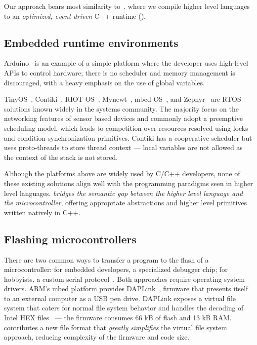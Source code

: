 Our approach bears most similarity to~\cite{varma2004java}, where we compile higher level languages to an \emph{optimized, event-driven} C++ runtime (\CON).

\subsection{Embedded runtime environments}


Arduino~\cite{buildingArduino2014} is an example of a simple platform where the developer uses high-level APIs to control hardware; there is no scheduler and memory management is discouraged, with a heavy emphasis on
the use of global variables.

TinyOS~\cite{levis2005tinyos}, Contiki~\cite{dunkels2012contiki}, RIOT OS~\cite{baccelli2013riot}, Mynewt~\cite{ApacheMy53:online}, mbed OS~\cite{ARMmbed}, and Zephyr~\cite{HomeZeph63:online} are RTOS solutions known widely in the systems community. The majority focus on the networking features of sensor based devices and commonly adopt a preemptive scheduling model, which leads to competition over resources resolved using locks and condition synchronization primitives. Contiki has a cooperative scheduler but uses proto-threads to store thread context --- local variables are not allowed as the context of the stack is not stored.

Although the platforms above are widely used by C/C++ developers, none of these existing solutions align well with the programming paradigms seen in higher level languages. \CO \emph{bridges the semantic gap between the higher level language and the microcontroller}, offering appropriate abstractions and higher level primitives written natively in C++.

\subsection{Flashing microcontrollers}

There are two common ways to transfer a program to the flash of a microcontroller: for embedded developers, a specialized debugger chip; for hobbyists, a custom serial protocol~\cite{AVRDUDEA15:online}. Both approaches require operating system drivers. ARM's mbed platform provides DAPLink~\cite{GitHubAR5:online}, firmware that presents itself to an external computer as a USB pen drive. DAPLink exposes a virtual file system that caters for normal file system behavior and handles the decoding of Intel HEX files~\cite{IntelHEX} --- the firmware consumes 66 kB of flash and 13 kB RAM. \UF contributes a new file format that \emph{greatly simplifies} the virtual file system approach, reducing complexity of the firmware and code size.

